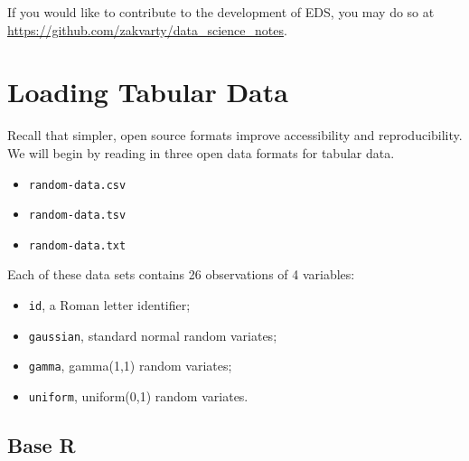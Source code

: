 \documentclass[
  12pt,
]{book}
\providecommand{\tightlist}{%
  \setlength{\itemsep}{0pt}\setlength{\parskip}{0pt}}
\begin{document}
If you would like to contribute to the development of EDS, you may do so at \url{https://github.com/zakvarty/data_science_notes}.

\hypertarget{loading-tabular-data}{%
\section{Loading Tabular Data}\label{loading-tabular-data}}

Recall that simpler, open source formats improve accessibility and reproducibility. We will begin by reading in three open data formats for tabular data.

\begin{itemize}
\item
  \texttt{random-data.csv}
\item
  \texttt{random-data.tsv}
\item
  \texttt{random-data.txt}
\end{itemize}

Each of these data sets contains 26 observations of 4 variables:

\begin{itemize}
\tightlist
\item
  \texttt{id}, a Roman letter identifier;
\item
  \texttt{gaussian}, standard normal random variates;
\item
  \texttt{gamma}, gamma(1,1) random variates;
\item
  \texttt{uniform}, uniform(0,1) random variates.
\end{itemize}

\hypertarget{base-r}{%
\subsection{Base R}\label{base-r}}
\end{document}
